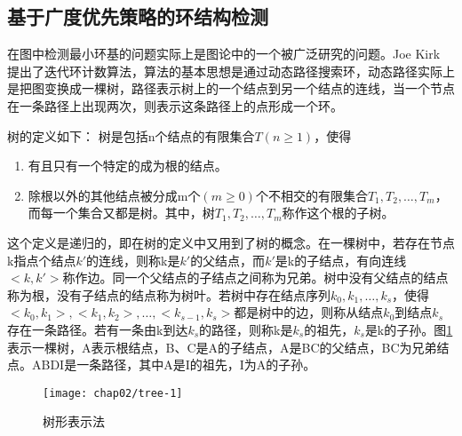 \subsection{基于广度优先策略的环结构检测}
\label{}


在图中检测最小环基的问题实际上是图论中的一个被广泛研究的问题。Joe Kirk 提出了迭代环计数算法，算法的基本思想是通过动态路径搜索环，动态路径实际上是把图变换成一棵树，路径表示树上的一个结点到另一个结点的连线，当一个节点在一条路径上出现两次，则表示这条路径上的点形成一个环。

树的定义如下：
树是包括n个结点的有限集合$T(n \geq 1)$\cite{zhangming}，使得
\begin{enumerate}
\item 有且只有一个特定的成为根的结点。
\item 除根以外的其他结点被分成m个$(m \geq 0)$个不相交的有限集合$T_1, T_2, \ldots, T_m$，而每一个集合又都是树。其中，树$T_1, T_2, \ldots, T_m$称作这个根的子树。
\end{enumerate}

这个定义是递归的，即在树的定义中又用到了树的概念。在一棵树中，若存在节点k指点个结点$k'$的连线，则称k是$k'$的父结点，而$k'$是k的子结点，有向连线$<k, k'>$称作边。同一个父结点的子结点之间称为兄弟。树中没有父结点的结点称为根，没有子结点的结点称为树叶。若树中存在结点序列$k_0,k_1,\ldots,k_s$，使得$<k_0,k_1>,<k_1,k_2>,\ldots,<k_{s-1},k_s>$都是树中的边，则称从结点$k_0$到结点$k_s$存在一条路径。若有一条由k到达$k_s$的路径，则称k是$k_s$的祖先，$k_s$是k的子孙。图\ref{fig:tree}表示一棵树，A表示根结点，B、C是A的子结点，A是BC的父结点，BC为兄弟结点。ABDI是一条路径，其中A是I的祖先，I为A的子孙。

\begin{figure}
\centering
\texttt{[image: chap02/tree-1]}
\caption{树形表示法}
\label{fig:tree}
\end{figure}

